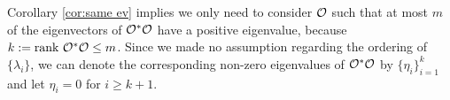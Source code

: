 Corollary \ref{cor:same ev} implies we only need to consider $\mathcal{O}$
such that at most $m$ of the eigenvectors of $\mathcal{O}^*\mathcal{O}$ have a
positive eigenvalue, because $k := \textup{rank}\  \mathcal{O}^*\mathcal{O} \leq m$. Since we
made no assumption regarding the ordering of $\{\lambda_i\}$, we can
denote the corresponding non-zero eigenvalues of $\mathcal{O}^*\mathcal{O}$ by
$\{\eta_i\}_{i=1}^{k}$ and let $\eta_i = 0$ for $i \geq k+1$.


